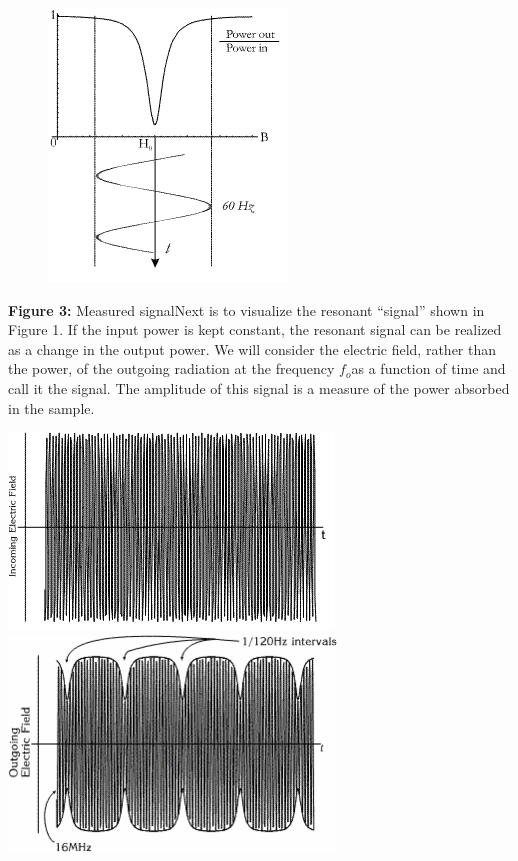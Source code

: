 \documentclass{../lab}
\begin{document}
\begin{figure}[h]
    \centering
    \href{http://experimentationlab.berkeley.edu/sites/default/files/images/NMR6.gif}{\includegraphics[width=0.5\linewidth]{images/NMR6.png}}
    \caption{}
    \label{fig:NMR6}
\end{figure}




\textbf{Figure 3:} Measured signalNext is to visualize the resonant ``signal'' shown in Figure 1. If the input power is kept constant, the resonant signal can be realized as a change in the output power. We will consider the electric field, rather than the power, of the outgoing radiation at the frequency $f_o$as a function of time and call it the signal. The amplitude of this signal is a measure of the power absorbed in the sample.

\noindent
\href{http://experimentationlab.berkeley.edu/sites/default/files/images/NMR7.gif}{\includegraphics[width=0.33\linewidth,keepaspectratio]{images/NMR7.png}}
\href{http://experimentationlab.berkeley.edu/sites/default/files/images/330px-NMR8.gif}{\includegraphics[width=0.33\linewidth,keepaspectratio]{images/330px-NMR8.png}}
\end{document}
